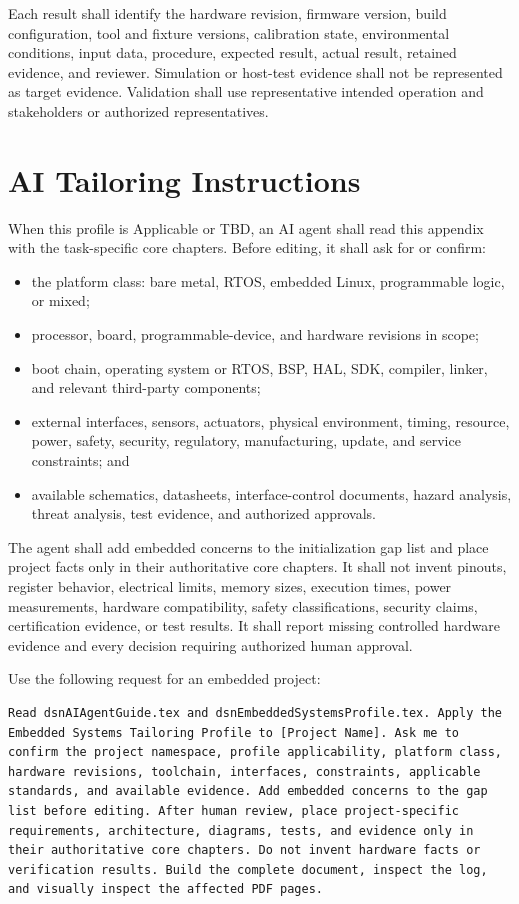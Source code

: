 Each result shall identify the hardware revision, firmware version, build
configuration, tool and fixture versions, calibration state, environmental
conditions, input data, procedure, expected result, actual result, retained
evidence, and reviewer. Simulation or host-test evidence shall not be
represented as target evidence. Validation shall use representative intended
operation and stakeholders or authorized representatives.

\section{AI Tailoring Instructions}
When this profile is Applicable or TBD, an AI agent shall read this appendix
with the task-specific core chapters. Before editing, it shall ask for or
confirm:

\begin{itemize}
\item the platform class: bare metal, RTOS, embedded Linux, programmable logic,
or mixed;
\item processor, board, programmable-device, and hardware revisions in scope;
\item boot chain, operating system or RTOS, BSP, HAL, SDK, compiler, linker,
and relevant third-party components;
\item external interfaces, sensors, actuators, physical environment, timing,
resource, power, safety, security, regulatory, manufacturing, update, and
service constraints; and
\item available schematics, datasheets, interface-control documents, hazard
analysis, threat analysis, test evidence, and authorized approvals.
\end{itemize}

The agent shall add embedded concerns to the initialization gap list and place
project facts only in their authoritative core chapters. It shall not invent
pinouts, register behavior, electrical limits, memory sizes, execution times,
power measurements, hardware compatibility, safety classifications, security
claims, certification evidence, or test results. It shall report missing
controlled hardware evidence and every decision requiring authorized human
approval.

Use the following request for an embedded project:

\begin{verbatim}
Read dsnAIAgentGuide.tex and dsnEmbeddedSystemsProfile.tex. Apply the
Embedded Systems Tailoring Profile to [Project Name]. Ask me to
confirm the project namespace, profile applicability, platform class,
hardware revisions, toolchain, interfaces, constraints, applicable
standards, and available evidence. Add embedded concerns to the gap
list before editing. After human review, place project-specific
requirements, architecture, diagrams, tests, and evidence only in
their authoritative core chapters. Do not invent hardware facts or
verification results. Build the complete document, inspect the log,
and visually inspect the affected PDF pages.
\end{verbatim}

